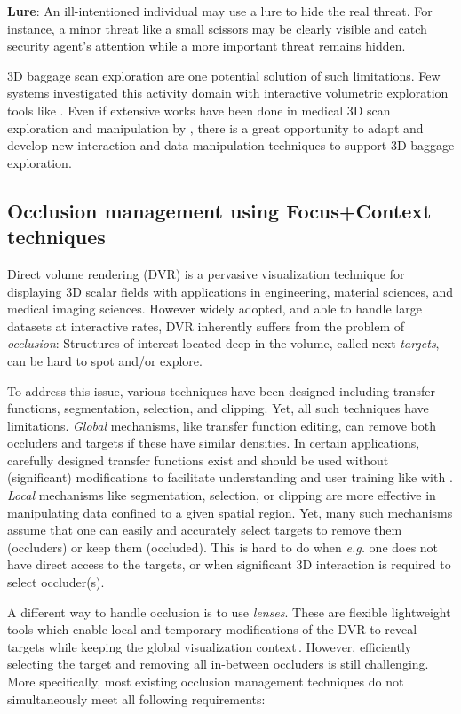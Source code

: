 \textbf{Lure}: An ill-intentioned individual may use a lure to hide the real threat. For instance, a minor threat like a small scissors may be clearly visible and catch security agent's attention while a more important threat remains hidden.


3D baggage scan exploration are one potential solution of such limitations. Few systems investigated this activity domain with interactive volumetric exploration tools like \cite{Li:2012:LVV:2425296.2425325}. Even if extensive works have been done in medical 3D scan exploration and manipulation by \cite{preim2013visual}, there is a great opportunity to adapt and develop new interaction and data manipulation techniques to support 3D baggage exploration.
 
 
 \subsection{Occlusion management using Focus+Context techniques}
 \label{introreq}
 
 Direct volume rendering (DVR) is a pervasive visualization technique for displaying 3D scalar fields with applications in engineering, material sciences, and medical imaging sciences. However widely adopted, and able to handle large datasets at interactive rates, DVR inherently suffers from the problem of \emph{occlusion}: Structures of interest located deep in the volume, called next \emph{targets}, can be hard to spot and/or explore.


To address this issue, various techniques have been designed including transfer functions, segmentation, selection, and clipping. Yet, all such techniques have limitations.  \emph{Global} mechanisms, like transfer function editing, can remove both occluders and targets if these have similar densities. In certain applications, carefully designed transfer functions exist and should be used without (significant) modifications to facilitate understanding and user training like with \cite{4276082}. \emph{Local} mechanisms like segmentation, selection, or clipping are more effective in manipulating data confined to a given spatial region. Yet, many such mechanisms assume that one can easily and accurately select targets to remove them (occluders) or keep them (occluded). This is hard to do when \emph{e.g.} one does not have direct access to the targets, or when significant 3D interaction is required to select occluder(s).


A different way to handle occlusion is to use \emph{lenses}. These are flexible lightweight tools which enable local and temporary modifications of the DVR to reveal targets while keeping the global visualization context\,\cite{595268,CGF:CGF12871,6327262}. However, efficiently selecting the target and  removing all in-between occluders is still challenging. More specifically, most existing occlusion management techniques do not simultaneously meet all following requirements: 


